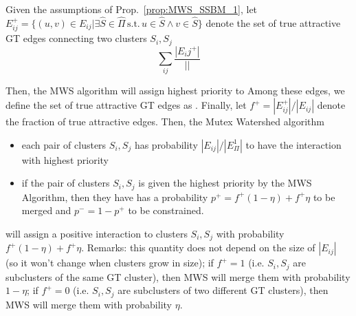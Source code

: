 \begin{prop}\label{prop:MWS_SSBM_2}
Given the assumptions of Prop.~\ref{prop:MWS_SSBM_1}, let $E_{ij}^+=\{(u,v) \in E_{ij} | \exists \hat{S}\in \hat{\Pi} \, \mathrm{s.t.} \, u\in \hat{S} \wedge v\in \hat{S} \}$ denote the set of true attractive GT edges connecting two clusters $S_i,S_j$
\begin{equation}
\sum_{ij} \frac{|E_ij^+|}{||}
\end{equation}
\end{prop}

Then, the MWS algorithm will assign highest priority to 
Among these edges, we define the set of true attractive GT edges as . Finally, let $f^+=|E_{ij}^+| / |E_{ij}|$ denote the fraction of true attractive edges. Then, the Mutex Watershed algorithm 


\begin{itemize}
\item each pair of clusters $S_i,S_j$ has probability $|E_{ij}| / |E_{\Pi}^1|$ to have the interaction with highest priority 
\item if the pair of clusters $S_i,S_j$ is given the highest priority by the MWS Algorithm, then they have has a probability $p^+=f^+(1-\eta) + f^+ \eta$ to be merged and $p^-=1-p^+$ to be constrained.
\end{itemize}
will assign a positive interaction to clusters $S_i,S_j$ with probability $f^+(1-\eta) + f^+ \eta$. 
Remarks: this quantity does not depend on the size of $|E_{ij}|$ (so it won't change when clusters grow in size); if $f^+=1$ (i.e. $S_i,S_j$ are subclusters of the same GT cluster), then MWS will merge them with probability $1-\eta$; if $f^+=0$ (i.e. $S_i,S_j$ are subclusters of two different GT clusters), then MWS will merge them with probability $\eta$.

